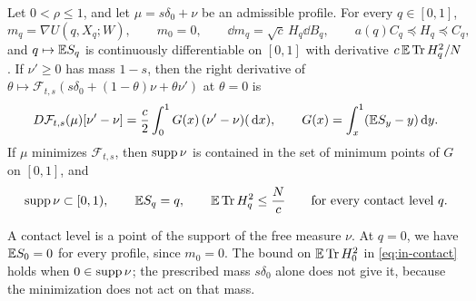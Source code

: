 \begin{proposition}
\label{prop:fnd-contact}
Let $0<\rho\le1$, and let $\mu=s\delta_0+\nu$ be an admissible profile.
For every $q\in[0,1]$,
\begin{equation}\label{eq:in-martingale}
 m_q=\nabla U(q,X_q;W),\qquad m_0=0,\qquad
 \dd m_q=\sqrt c\,H_q\dd B_q,
 \qquad a(q)C_q\preceq H_q\preceq C_q ,
\end{equation}
and $q\mapsto\mathbb E S_q$ is continuously differentiable on $[0,1]$ with
derivative $c\,\mathbb E\operatorname{Tr} H_q^2/N$. If $\nu'\ge0$ has mass $1-s$, then the
right derivative of
$\theta\mapsto\mathcal F_{t,s}(s\delta_0+(1-\theta)\nu+\theta\nu')$ at
$\theta=0$ is
\begin{equation}\label{eq:fnd-first-variation}
 D\mathcal F_{t,s}(\mu)[\nu'-\nu]
    =\frac c2\int_0^1G(x)\,(\nu'-\nu)(\,\mathrm d x),\qquad
 G(x)=\int_x^1(\mathbb E S_y-y)\,\mathrm d y .
\end{equation}
If $\mu$ minimizes $\mathcal F_{t,s}$, then $\operatorname{supp}\nu$ is contained in
the set of minimum points of $G$ on $[0,1]$, and
\begin{equation}\label{eq:in-contact}
 \operatorname{supp}\nu\subset[0,1),\qquad
 \mathbb E S_q=q,\qquad \mathbb E\operatorname{Tr} H_q^2\le\frac Nc
 \qquad\text{for every contact level }q .
\end{equation}
\end{proposition}

\begin{remark}\label{rem:fnd-root}
A contact level is a point of the support of the free measure $\nu$. At
$q=0$, we have $\mathbb E S_0=0$ for every profile, since $m_0=0$. The bound
on $\mathbb E\operatorname{Tr} H_0^2$ in \eqref{eq:in-contact} holds when $0\in\operatorname{supp}\nu$;
the prescribed mass $s\delta_0$ alone does not give it, because the
minimization does not act on that mass.
\end{remark}

